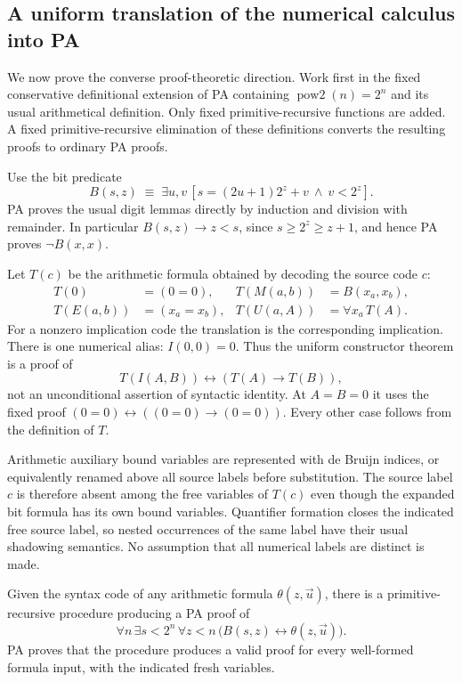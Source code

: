 \subsection{A uniform translation of the numerical calculus into PA}

We now prove the converse proof-theoretic direction. Work first in the
fixed conservative definitional extension of PA containing
$\operatorname{pow2}(n)=2^n$ and its usual arithmetical definition.
Only fixed primitive-recursive functions are added. A fixed
primitive-recursive elimination of these definitions converts the
resulting proofs to ordinary PA proofs.

Use the bit predicate
\[
 B(s,z)\;\equiv\;
 \exists u,v\,[s=(2u+1)2^z+v\ \wedge\ v<2^z].
\]
PA proves the usual digit lemmas directly by induction and division
with remainder. In particular $B(s,z)\to z<s$, since
$s\ge 2^z\ge z+1$, and hence PA proves $\neg B(x,x)$.

Let $T(c)$ be the arithmetic formula obtained by decoding the source
code $c$:
\begin{align*}
 T(0)&=(0=0),& T(M(a,b))&=B(x_a,x_b),\\
 T(E(a,b))&=(x_a=x_b),& T(U(a,A))&=\forall x_a\,T(A).
\end{align*}
For a nonzero implication code the translation is the corresponding
implication. There is one numerical alias:
$I(0,0)=0$. Thus the uniform constructor theorem is a proof of
\[
 T(I(A,B))\leftrightarrow(T(A)\to T(B)),
\]
not an unconditional assertion of syntactic identity. At $A=B=0$ it
uses the fixed proof $(0=0)\leftrightarrow((0=0)\to(0=0))$.
Every other case follows from the definition of $T$.

Arithmetic auxiliary bound variables are represented with de Bruijn
indices, or equivalently renamed above all source labels before
substitution. The source label $c$ is therefore absent among the free
variables of $T(c)$ even though the expanded bit formula has its own
bound variables. Quantifier formation closes the indicated free source
label, so nested occurrences of the same label have their usual
shadowing semantics. No assumption that all numerical labels are
distinct is made.

\begin{lemma}
\label{lem:pa-bit-comprehension}
Given the syntax code of any arithmetic formula $\theta(z,\vec u)$,
there is a primitive-recursive procedure producing a PA proof of
\[
 \forall n\,\exists s<2^n\,\forall z<n\,
       \bigl(B(s,z)\leftrightarrow\theta(z,\vec u)\bigr).
                                                        \tag{2}
\]
PA proves that the procedure produces a valid proof for every
well-formed formula input, with the indicated fresh variables.
\end{lemma}

